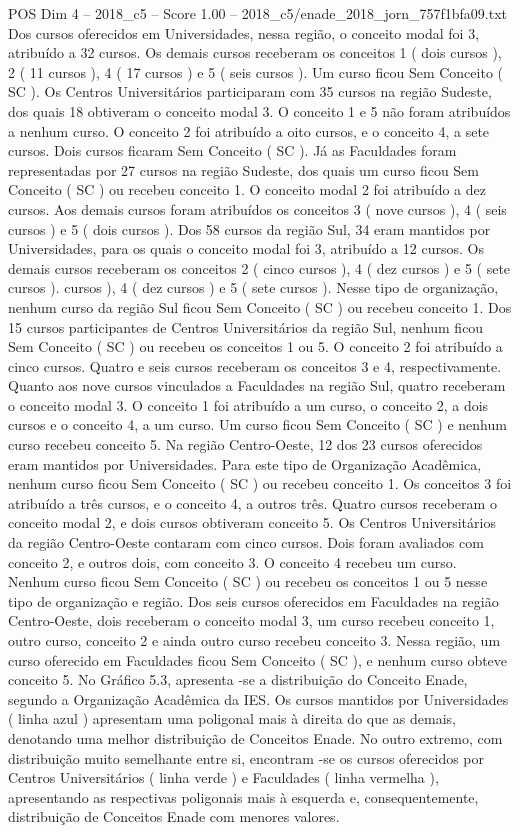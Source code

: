 \begin{textsample}{POS Dim 4 – 2018\_c5 – Score 1.00 – 2018\_c5/enade\_2018\_jorn\_757f1bfa09.txt}
Dos cursos oferecidos em Universidades, nessa região, o conceito modal foi 3, atribuído a 32 cursos.
Os demais cursos receberam os conceitos 1 ( dois cursos ), 2 ( 11 cursos ), 4 ( 17 cursos ) e 5 ( seis cursos ).
Um curso ficou Sem Conceito ( SC ).
Os Centros Universitários participaram com 35 cursos na região Sudeste, dos quais 18 obtiveram o conceito modal 3.
O conceito 1 e 5 não foram atribuídos a nenhum curso.
O conceito 2 foi atribuído a oito cursos, e o conceito 4, a sete cursos.
Dois cursos ficaram Sem Conceito ( SC ).
Já as Faculdades foram representadas por 27 cursos na região Sudeste, dos quais um curso ficou Sem Conceito ( SC ) ou recebeu conceito 1.
O conceito modal 2 foi atribuído a dez cursos.
Aos demais cursos foram atribuídos os conceitos 3 ( nove cursos ), 4 ( seis cursos ) e 5 ( dois cursos ).
Dos 58 cursos da região Sul, 34 eram mantidos por Universidades, para os quais o conceito modal foi 3, atribuído a 12 cursos.
Os demais cursos receberam os conceitos 2 ( cinco cursos ), 4 ( dez cursos ) e 5 ( sete cursos ). cursos ), 4 ( dez cursos ) e 5 ( sete cursos ).
Nesse tipo de organização, nenhum curso da região Sul ficou Sem Conceito ( SC ) ou recebeu conceito 1.
Dos 15 cursos participantes de Centros Universitários da região Sul, nenhum ficou Sem Conceito ( SC ) ou recebeu os conceitos 1 ou 5.
O conceito 2 foi atribuído a cinco cursos.
Quatro e seis cursos receberam os conceitos 3 e 4, respectivamente.
Quanto aos nove cursos vinculados a Faculdades na região Sul, quatro receberam o conceito modal 3.
O conceito 1 foi atribuído a um curso, o conceito 2, a dois cursos e o conceito 4, a um curso.
Um curso ficou Sem Conceito ( SC ) e nenhum curso recebeu conceito 5.
Na região Centro-Oeste, 12 dos 23 cursos oferecidos eram mantidos por Universidades.
Para este tipo de Organização Acadêmica, nenhum curso ficou Sem Conceito ( SC ) ou recebeu conceito 1.
Os conceitos 3 foi atribuído a três cursos, e o conceito 4, a outros três.
Quatro cursos receberam o conceito modal 2, e dois cursos obtiveram conceito 5.
Os Centros Universitários da região Centro-Oeste contaram com cinco cursos.
Dois foram avaliados com conceito 2, e outros dois, com conceito 3.
O conceito 4 recebeu um curso.
Nenhum curso ficou Sem Conceito ( SC ) ou recebeu os conceitos 1 ou 5 nesse tipo de organização e região.
Dos seis cursos oferecidos em Faculdades na região Centro-Oeste, dois receberam o conceito modal 3, um curso recebeu conceito 1, outro curso, conceito 2 e ainda outro curso recebeu conceito 3.
Nessa região, um curso oferecido em Faculdades ficou Sem Conceito ( SC ), e nenhum curso obteve conceito 5.
No Gráfico 5.3, apresenta -se a distribuição do Conceito Enade, segundo a Organização Acadêmica da IES.
Os cursos mantidos por Universidades ( linha azul ) apresentam uma poligonal mais à direita do que as demais, denotando uma melhor distribuição de Conceitos Enade.
No outro extremo, com distribuição muito semelhante entre si, encontram -se os cursos oferecidos por Centros Universitários ( linha verde ) e Faculdades ( linha vermelha ), apresentando as respectivas poligonais mais à esquerda e, consequentemente, distribuição de Conceitos Enade com menores valores.

\end{textsample}

